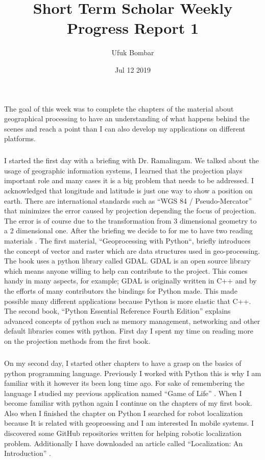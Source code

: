 \documentclass{article}
\title{Short Term Scholar Weekly Progress Report 1}
\author{Ufuk Bombar}
\date{Jul 12 2019}
\begin{document}
\maketitle

\subparagraph{}
The goal of this week was to complete the chapters of the material about geographical processing to have an understanding of what happens behind the scenes and reach a point than I can also develop my applications on different platforms.

\subparagraph{}
I started the first day with a briefing with Dr. Ramalingam. We talked about the usage of geographic information systems, I learned that the projection plays important role and many cases it is a big problem that needs to be addressed. I acknowledged that longitude and latitude is just one way to show a position on earth. There are international standards such as “WGS 84 / Pseudo-Mercator” that minimizes the error caused by projection depending the focus of projection. The error is of course due to the transformation from 3 dimensional geometry to a 2 dimensional one. After the briefing we decide to for me to have two reading materials \cite{geoprocessing}. The first material, “Geoprocessing with Python“, briefly introduces the concept of vector and raster which are data structures used in geo-processing. The book uses a python library called GDAL. GDAL is an open source library which means anyone willing to help can contribute to the project. This comes handy in many aspects, for example; GDAL is originally written in C++ and by the efforts of many contributors the bindings for Python made. This made possible many different applications because Python is more elastic that C++. The second book, “Python Essential Reference Fourth Edition” \cite{pythonreference} explains advanced concepts of python such as memory management, networking and other default libraries comes with python. First day I spent my time on reading more on the projection methods from   the first book.

\subparagraph{}
On my second day, I started other chapters to have a grasp on the basics of python programming language. Previously I worked with Python this is why I am familiar with it however its been long time ago. For sake of remembering the language I studied my previous application named “Game of Life” \cite{gameoflife}. When I become familiar with python again I continue on the chapters of my first book. Also when I finished the chapter on Python I searched for robot localization because It is related with geoproessing and I am interested In mobile systems. I discovered some GitHub \cite{githubrepo} repositories written for helping robotic localization problem. Additionally I have downloaded an article called “Localization: An Introduction” \cite{robot}.
\end{document}
